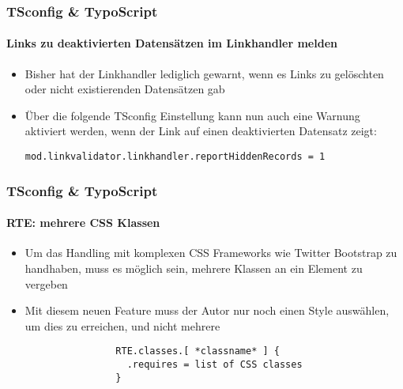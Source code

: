 \begin{frame}[fragile]
	\frametitle{TSconfig \& TypoScript}
	\framesubtitle{Links zu deaktivierten Datensätzen im Linkhandler melden}

	\begin{itemize}
		\item Bisher hat der Linkhandler lediglich gewarnt, wenn es Links zu gelöschten oder nicht existierenden Datensätzen gab
		\item Über die folgende TSconfig Einstellung kann nun auch eine Warnung aktiviert werden, wenn der Link auf einen deaktivierten Datensatz zeigt:

			\lstinline!mod.linkvalidator.linkhandler.reportHiddenRecords = 1!

	\end{itemize}

\end{frame}


\begin{frame}[fragile]
	\frametitle{TSconfig \& TypoScript}
	\framesubtitle{RTE: mehrere CSS Klassen}

	\begin{itemize}
		\item Um das Handling mit komplexen CSS Frameworks wie Twitter Bootstrap zu handhaben, muss es möglich sein, mehrere Klassen an ein Element zu vergeben
		\item Mit diesem neuen Feature muss der Autor nur noch einen Style auswählen, um dies zu erreichen, und nicht mehrere

			\begin{lstlisting}
				RTE.classes.[ *classname* ] {
				  .requires = list of CSS classes
				}
			\end{lstlisting}

	\end{itemize}

\end{frame}


